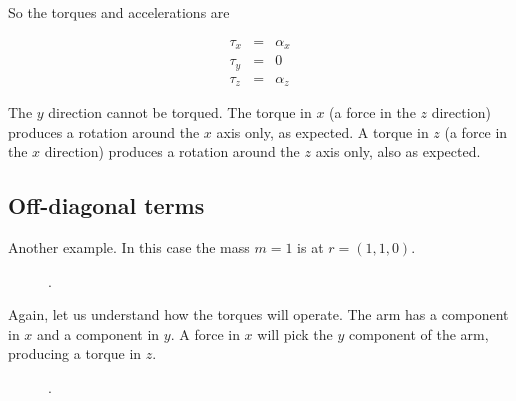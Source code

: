 So the torques and accelerations are

\begin{eqnarray}
\tau_x &=& \alpha_x \\
\tau_y &=& 0\\
\tau_z &=& \alpha_z
\end{eqnarray}

The $y$ direction cannot be torqued. The torque in $x$ (a force in the $z$ direction) produces a rotation around the $x$ axis only, as expected. A torque in $z$ (a force in the $x$ direction) produces a rotation around the $z$ axis only, also as expected. 


\subsection{Off-diagonal terms}

Another example. In this case the mass $m=1$ is at $r=(1,1,0)$.

\begin{figure}
  \begin{center}
  \end{center}
  \caption[]{.}
  \label{fig:tensor15}
\end{figure}

Again, let us understand how the torques will operate. The arm has a component in $x$ and a component in $y$. A force in $x$ will pick the $y$ component of the arm, producing a torque in $z$. 

\begin{figure}
  \begin{center}
  \end{center}
  \caption[]{.}
  \label{fig:tensor16}
\end{figure}

